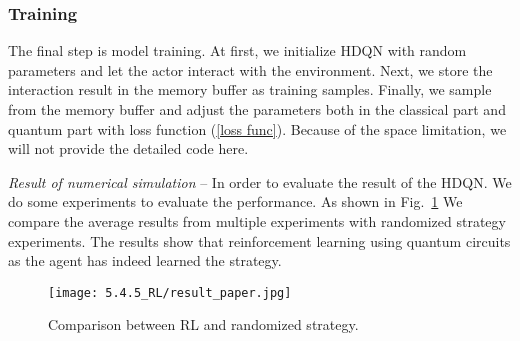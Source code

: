 \subsubsection{Training}
The final step is model training. At first, we initialize HDQN with random parameters and let the actor interact with the environment. Next, we store the interaction result in the memory buffer as training samples. Finally, we sample from the memory buffer and adjust the parameters both in the classical part and quantum part with loss function (\ref{loss func}). Because of the space limitation, we will not provide the detailed code here.

\textit{Result of numerical simulation} -- In order to evaluate the result of the HDQN. We do some experiments to evaluate the performance. As shown in Fig.~\ref{stochastic} We compare the average results from multiple experiments with randomized strategy experiments. The results show that reinforcement learning using quantum circuits as the agent has indeed learned the strategy.
\begin{figure}[ht]
  \centering
  \texttt{[image: 5.4.5\_RL/result\_paper.jpg]}
  \caption{\label{stochastic} Comparison between RL and randomized strategy.}
\end{figure}
